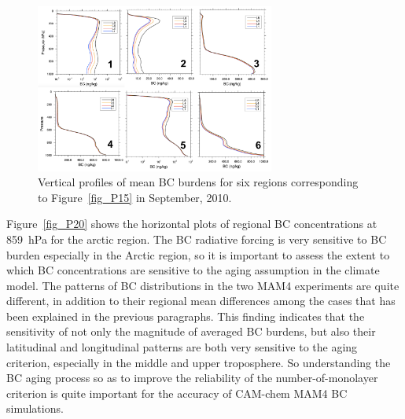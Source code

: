 \documentclass[12pt, fullpage]{uiucthesis2009}
\begin{document}
	
	\begin{figure}[h] 
		\begin{center}
			\includegraphics[width = 0.7\textwidth]{Figure16}
			\caption[Vertical profiles of mean BC burdens for six regions corresponding to Figure~\ref{fig_P15} in September, 2010]{\label{fig_P16} Vertical profiles of mean BC burdens for six regions corresponding to Figure~\ref{fig_P15} in September, 2010.}
		\end{center}
	\end{figure}
	
	
	Figure~\ref{fig_P20} shows the horizontal plots of regional BC concentrations at 859~hPa for the arctic region. The BC radiative forcing is very sensitive to BC burden especially in the Arctic region, so it is important to assess the extent to which BC concentrations are sensitive to the aging assumption in the climate model. The patterns of BC distributions in the two MAM4 experiments are quite different, in addition to their regional mean differences among the cases that has been explained in the previous paragraphs. This finding indicates that the sensitivity of not only the magnitude of averaged BC burdens, but also their latitudinal and longitudinal patterns are both very sensitive to the aging criterion, especially in the middle and upper troposphere. So understanding the BC aging process so as to improve the reliability of the number-of-monolayer criterion is quite important for the accuracy of CAM-chem MAM4 BC simulations.
	
\end{document}
